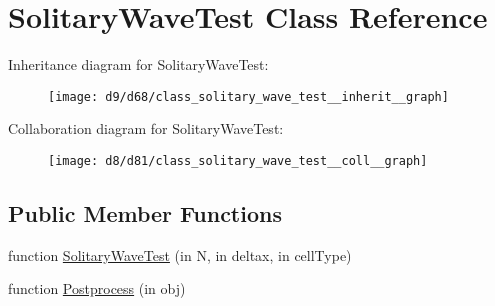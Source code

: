 \hypertarget{class_solitary_wave_test}{}\section{Solitary\+Wave\+Test Class Reference}
\label{class_solitary_wave_test}


Inheritance diagram for Solitary\+Wave\+Test\+:
\nopagebreak
\begin{figure}[H]
\begin{center}
\leavevmode
\texttt{[image: d9/d68/class\_solitary\_wave\_test\_\_inherit\_\_graph]}
\end{center}
\end{figure}


Collaboration diagram for Solitary\+Wave\+Test\+:
\nopagebreak
\begin{figure}[H]
\begin{center}
\leavevmode
\texttt{[image: d8/d81/class\_solitary\_wave\_test\_\_coll\_\_graph]}
\end{center}
\end{figure}
\subsection*{Public Member Functions}
\begin{DoxyCompactItemize}
\item 
function \hyperlink{class_solitary_wave_test_a1a3a89e557bf2c2e5cd8e13d15c3f836}{Solitary\+Wave\+Test} (in N, in deltax, in cell\+Type)
\item 
function \hyperlink{class_solitary_wave_test_a45bfc504223c44060d772333e0018eec}{Postprocess} (in obj)
\end{DoxyCompactItemize}
